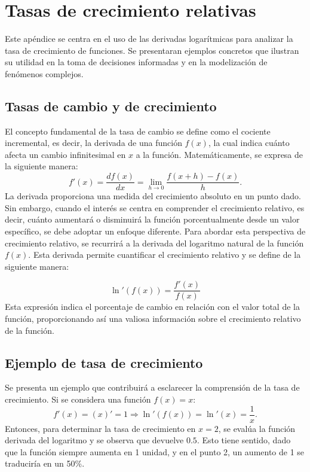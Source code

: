 \chapter{Tasas de crecimiento relativas}\label{Apendice_C}

Este apéndice se centra en el uso de las derivadas logarítmicas para analizar la tasa de crecimiento de funciones.  Se presentaran ejemplos concretos que ilustran su utilidad en la toma de decisiones informadas y en la modelización de fenómenos complejos. 


\section{Tasas de cambio y de crecimiento}
El concepto fundamental de la tasa de cambio se define como el cociente incremental, es decir, la derivada de una función $f(x)$, la cual indica cuánto afecta un cambio infinitesimal en 
$x$ a la función. Matemáticamente, se expresa de la siguiente manera:
$$f'(x)=\dfrac{df(x)}{dx}=\lim_{h \to 0} \dfrac{f(x+h)-f(x)}{h}.$$
%
La derivada proporciona una medida del crecimiento absoluto en un punto dado. Sin embargo, cuando el interés se centra en comprender el crecimiento relativo, es decir, cuánto aumentará o disminuirá la función porcentualmente desde un valor específico, se debe adoptar un enfoque diferente.
%
Para abordar esta perspectiva de crecimiento relativo, se recurrirá a la derivada del logaritmo natural de la función $f(x)$. Esta derivada permite cuantificar el crecimiento relativo y se define de la siguiente manera:

$$\ln'(f(x))=\dfrac{f'(x)}{f(x)}$$
%
Esta expresión indica el porcentaje de cambio en relación con el valor total de la función, proporcionando así una valiosa información sobre el crecimiento relativo de la función.

\section{Ejemplo de tasa de crecimiento}
Se presenta un ejemplo que contribuirá a esclarecer la comprensión de la tasa de crecimiento. Si se considera una función $f(x)=x$:
%
$$f'(x)=(x)'=1 \Rightarrow
\ln'(f(x))=\ln'(x)=\dfrac{1}{x}.$$
%
Entonces, para determinar la tasa de crecimiento en $x=2$, se evalúa la función derivada del logaritmo y se observa que  devuelve $0.5$. Esto tiene sentido, dado que la función siempre aumenta en 1 unidad, y en el punto 2, un aumento de 1 se traduciría en un 50\%.




